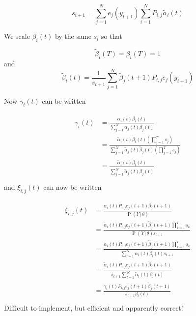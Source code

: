\documentclass{article}
\DeclareMathOperator{\Prob}{P}
\begin{document}
\begin{equation}
    s_{t+1} = \sum_{j=1}^Ne_j(y_{t+1})\sum_{i=1}^NP_{i,j}\tilde{\alpha}_i(t)
\end{equation}

We scale $\beta_i(t)$ by the same $s_i$ so that

\begin{equation}
    \tilde{\beta}_i(T) = \beta_i(T) = 1
\end{equation}
and
\begin{equation}
    \tilde{\beta}_i(t) = \frac{1}{s_{t+1}}\sum_{j=1}^N\tilde{\beta}_j(t+1)P_{i,j}e_j(y_{t+1})
\end{equation}

Now $\gamma_i(t)$ can be written

\begin{align}
    \begin{split}
        \gamma_i(t) &=
        \frac{\alpha_i(t)\beta_i(t)}{\sum_{j=1}^N\alpha_j(t)\beta_j(t)} \\
        &=
        \frac{\tilde{\alpha}_i(t)\tilde{\beta}_i(t)\left(\prod_{j=1}^Ts_j\right)}
        {\sum_{j=1}^N\tilde{\alpha}_j(t)\tilde{\beta}_j(t)\left(\prod_{j=1}^Ts_j\right)} \\
        &=
        \frac{\tilde{\alpha}_i(t)\tilde{\beta}_i(t)}
        {\sum_{j=1}^N\tilde{\alpha}_j(t)\tilde{\beta}_j(t)} \\
    \end{split}
\end{align}
and $\xi_{i,j}(t)$ can now be written

\begin{align}
    \begin{split}
        \xi_{i,j}(t) &= 
                 \frac{\alpha_i(t)P_{i,j}e_j(t+1)\beta_j(t+1)}
                 {\Prob(Y\,|\,\theta)} \\
                 &= 
                 \frac{\tilde{\alpha}_i(t)P_{i,j}e_j(t+1)\tilde{\beta}_j(t+1)\prod_{k=1}^Ts_k}
                 {\Prob(Y\,|\,\theta)s_{t+1}} \\
                 &= 
                 \frac{\tilde{\alpha}_i(t)P_{i,j}e_j(t+1)\tilde{\beta}_j(t+1)\prod_{k=1}^Ts_k}
                 {\sum_{l=1}^N\alpha_l(t)\beta_l(t)s_{t+1}} \\
                 &= 
                 \frac{\tilde{\alpha}_i(t)P_{i,j}e_j(t+1)\tilde{\beta}_j(t+1)}
                 {s_{t+1}\sum_{l=1}^N\tilde{\alpha}_l(t)\tilde{\beta}_l(t)} \\
                 &= 
                 \frac{\gamma_i(t)P_{i,j}e_j(t+1)\tilde{\beta}_j(t+1)}
                 {s_{t+1}\beta_i(t)} \\
    \end{split}
\end{align}
Difficult to implement, but efficient and apparently correct!
\end{document}
